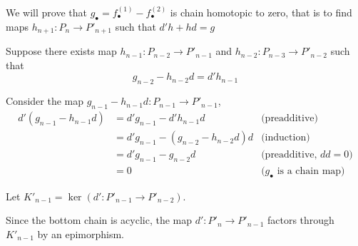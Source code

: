 \documentclass{article}
\begin{document}
\begin{longproof}
\begin{enumerate}
        We will prove that $g_\bullet = f^{(1)}_\bullet - f^{(2)}_\bullet$ is chain homotopic to zero, that is to find maps $h_{n+1}: P_n \to P'_{n+1}$ such that $d'h + hd = g$

        \begin{center}
        \end{center}

        Suppose there exists map $h_{n-1}: P_{n-2} \to P'_{n-1}$ and $h_{n-2}: P_{n-3} \to P'_{n-2}$ such that
        $$
            g_{n-2} - h_{n-2} d = d' h_{n-1}
        $$

        \begin{center}
        \end{center}

        Consider the map $g_{n-1} - h_{n-1} d: P_{n-1} \to P'_{n-1}$,
        \begin{align*}
            d'(g_{n-1} - h_{n-1} d) 
            &= d' g_{n-1} - d' h_{n-1} d &\text{(preadditive)}\\
            &= d' g_{n-1} - (g_{n-2} - h_{n-2} d) d &\text{(induction)}\\
            &= d' g_{n-1} - g_{n-2} d &\text{(preadditive, $dd=0$)}\\
            &= 0 &\text{($g_\bullet$ is a chain map)}
        \end{align*}

        Let $K'_{n-1} = \ker(d': P'_{n-1} \to P'_{n-2})$.

        Since the bottom chain is acyclic, the map $d': P'_n \to P'_{n-1}$ factors through $K'_{n-1}$ by an epimorphism.


\end{enumerate}
\end{longproof}
\end{document}

